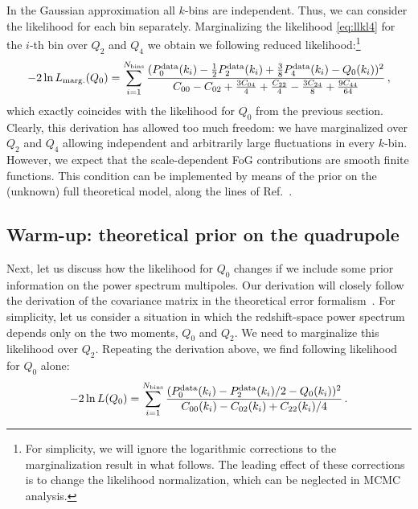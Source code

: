 \documentclass[12pt,a4paper]{article}
\newcommand{\be}{\begin{equation}}
\newcommand{\ee}{\end{equation}}
\renewcommand{\ln}{\mathop{\rm ln}\nolimits}
\begin{document}
In the Gaussian approximation all $k$-bins are independent. 
Thus, we can consider the likelihood for each bin separately. 
Marginalizing
the likelihood \eqref{eq:llkl4}
for the $i$-th bin over $Q_2$ and $Q_4$ we obtain we following reduced likelihood:\footnote{For simplicity, we will ignore the logarithmic corrections to the marginalization 
result in 
what follows. 
The leading effect of these corrections is to change the likelihood normalization, which can be neglected in MCMC analysis.
}
\be 
\label{eq:llk_base}
-2\ln L_{\rm marg.}(Q_0) = \sum_{i=1}^{N_{\rm bins}} \frac{(P^{{\rm data}}_{0}(k_i)-\frac{1}{2}P_{2}^{{\rm data}}(k_i)+\frac{3}{8}
P_{4}^{{\rm data}}(k_i)
- Q_0(k_i))^2}{C_{00}-C_{02}+\frac{3 C_{04}}{4}+\frac{C_{22}}{4}-\frac{3 C_{24}}{8}+\frac{9 C_{44}}{64}}\,,
\ee
which exactly coincides with the likelihood for $Q_0$ from the previous section. 
Clearly, this derivation has allowed too much freedom:
we have marginalized over $Q_2$ and $Q_4$ allowing independent and 
arbitrarily large fluctuations in every $k$-bin. 
However, we expect that the scale-dependent FoG contributions are smooth finite functions.
This condition can be implemented by means of the prior on the (unknown) full theoretical model,
along the lines of Ref.~\cite{Baldauf:2016sjb}.


\subsection{Warm-up: theoretical prior on the quadrupole}

Next, let us discuss how the likelihood for $Q_0$ changes if we include some prior information
on the power spectrum multipoles.
Our derivation will closely follow the derivation of the 
covariance matrix in the theoretical error formalism~\cite{Baldauf:2016sjb}.
For simplicity, let us consider a situation in which the redshift-space power spectrum 
depends only on the two moments, $Q_0$ and $Q_2$. 
We need to marginalize this likelihood over $Q_2$. Repeating the derivation above, 
we find following likelihood for $Q_0$ alone:
\be 
-2\ln L(Q_0) = \sum_{i=1}^{N_{\rm bins}}\frac{(P^{\rm data}_{0}(k_i)-P^{\rm data}_{2}(k_i)/2-Q_0(k_i))^2}{C_{00}(k_i) - C_{02}(k_i)+C_{22}(k_i)/4}\,.
\ee
\end{document}
